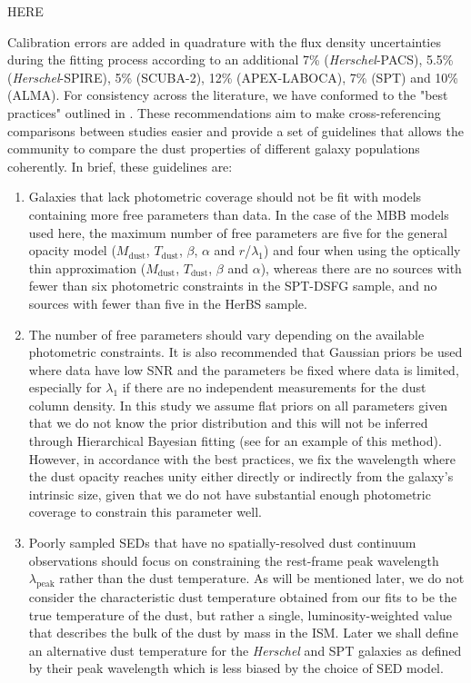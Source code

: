 {\color{red}HERE}

Calibration errors are added in quadrature with the flux density uncertainties during the fitting process according to an additional 7\% (\textit{Herschel}-PACS), 5.5\% (\textit{Herschel}-SPIRE), 5\% (SCUBA-2), 12\% (APEX-LABOCA), 7\% (SPT) and 10\% (ALMA). For consistency across the literature, we have conformed to the "best practices" outlined in \citealt{Drew_2022}. These recommendations aim to make cross-referencing comparisons between studies easier and provide a set of guidelines that allows the community to compare the dust properties of different galaxy populations coherently. In brief, these guidelines are: 

\begin{enumerate}
	\item Galaxies that lack photometric coverage should not be fit with models containing more free parameters than data. In the case of the MBB models used here, the maximum number of free parameters are five for the general opacity model ($M_{\textrm{dust}}$, $T_{\textrm{dust}}$, $\beta$, $\alpha$ and $r$/$\lambda_1$) and four when using the optically thin approximation ($M_{\textrm{dust}}$, $T_{\textrm{dust}}$, $\beta$ and $\alpha$), whereas there are no sources with fewer than six photometric constraints in the SPT-DSFG sample, and no sources with fewer than five in the HerBS sample.
	\item The number of free parameters should vary depending on the available photometric constraints. It is also recommended that Gaussian priors be used where data have low SNR and the parameters be fixed where data is limited, especially for $\lambda_1$ if there are no independent measurements for the dust column density. In this study we assume flat priors on all parameters given that we do not know the prior distribution and this will not be inferred through Hierarchical Bayesian fitting (see \citealt{Lamperti_2019} for an example of this method). However, in accordance with the best practices, we fix the wavelength where the dust opacity reaches unity either directly or indirectly from the galaxy's intrinsic size, given that we do not have substantial enough photometric coverage to constrain this parameter well.
	\item Poorly sampled SEDs that have no spatially-resolved dust continuum observations should focus on constraining the rest-frame peak wavelength $\lambda_{\textrm{peak}}$ rather than the dust temperature. As will be mentioned later, we do not consider the characteristic dust temperature obtained from our fits to be the true temperature of the dust, but rather a single, luminosity-weighted value that describes the bulk of the dust by mass in the ISM. Later we shall define an alternative dust temperature for the \textit{Herschel} and SPT galaxies as defined by their peak wavelength which is less biased by the choice of SED model.
\end{enumerate}

